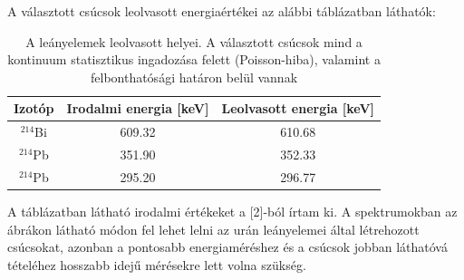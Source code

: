 \documentclass[12pt,a4paper]{article}
\begin{document}
A választott csúcsok leolvasott energiaértékei az alábbi táblázatban láthatók:
\begin{table}[!h]
\begin{center}
\begin{tabular}{|c|c|c|}
\hline
Izotóp & Irodalmi energia [keV] & Leolvasott energia [keV]\\
\hline
$^{214}$Bi & 609.32 & 610.68\\
\hline
$^{214}$Pb & 351.90 & 352.33\\
\hline
$^{214}$Pb & 295.20 & 296.77\\ 
\hline
\end{tabular}
\caption{A leányelemek leolvasott helyei. A választott csúcsok mind a kontinuum statisztikus ingadozása felett (Poisson-hiba), valamint a felbonthatósági határon belül vannak}
\end{center}
\end{table}

A táblázatban látható irodalmi értékeket a [2]-ból írtam ki. A spektrumokban az ábrákon látható módon fel lehet lelni az urán leányelemei által létrehozott csúcsokat, azonban a pontosabb energiaméréshez és a csúcsok jobban láthatóvá tételéhez hosszabb idejű mérésekre lett volna szükség. 
\end{document}
